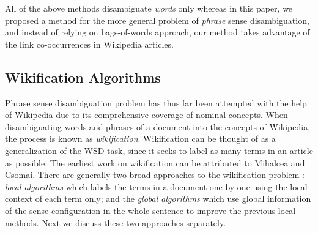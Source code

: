 All of the above methods disambiguate {\em words} only whereas
in this paper, we proposed a method for the more general problem of
{\em phrase} sense disambiguation,
and instead of relying on bags-of-words approach,
our method takes advantage of the link co-occurrences in Wikipedia articles.

\subsection{Wikification Algorithms}
Phrase sense disambiguation problem has thus far been attempted with
the help of Wikipedia due to its comprehensive coverage of nominal
concepts. When disambiguating words
and phrases of a document into the concepts of Wikipedia,
the process is known as {\em wikification}. Wikification can be thought of
as a generalization of the WSD task, since it seeks to label as many
terms in an article as possible. The earliest work on wikification can be
attributed to Mihalcea and Csomai\cite{MihalceaC07}.
There are generally two broad approaches to the wikification problem
\cite{RatinovRDA11}:
{\em local algorithms} which labels the terms in a document one by one
using the local context of each term only;
and the {\em global algorithms} which use global information of
the sense configuration in the whole sentence
to improve the previous local methods.
Next we discuss these two approaches separately.

